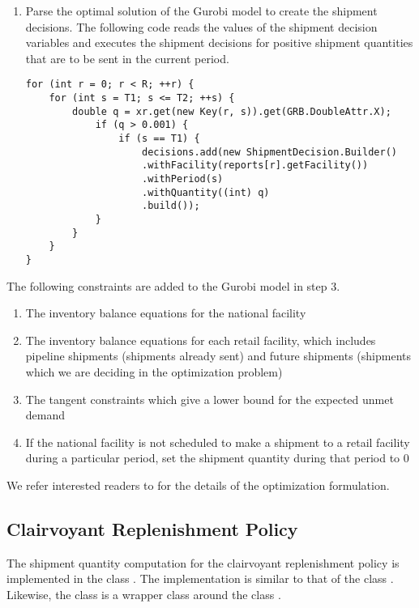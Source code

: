 \begin{enumerate}
\item Parse the optimal solution of the Gurobi model
to create the shipment decisions.
The following code reads the values
of the shipment decision variables 
and executes the shipment decisions
for positive shipment quantities that are to be sent in the current period.
\begin{lstlisting}
for (int r = 0; r < R; ++r) {
    for (int s = T1; s <= T2; ++s) {
        double q = xr.get(new Key(r, s)).get(GRB.DoubleAttr.X);
            if (q > 0.001) {
                if (s == T1) {
                    decisions.add(new ShipmentDecision.Builder()
                    .withFacility(reports[r].getFacility())
                    .withPeriod(s)
                    .withQuantity((int) q)
                    .build());
            }
        }
    }
}
\end{lstlisting}
\end{enumerate}

The following constraints are added to the Gurobi model in step 3.
\begin{enumerate}
\item The inventory balance equations for the national facility
\item The inventory balance equations for each retail facility,
which includes pipeline shipments (shipments already sent)
and future shipments
(shipments which we are deciding in the optimization problem)
\item The tangent constraints which give
a lower bound for the expected unmet demand
\item If the national facility is not scheduled to make a shipment
to a retail facility during a particular period,
set the shipment quantity during that period to $0$
\end{enumerate}

We refer interested readers to \citet{gallien-leung-yadav-2014}
for the details of the optimization formulation.







\subsection{Clairvoyant Replenishment Policy}

The shipment quantity computation for the clairvoyant replenishment policy
is implemented in the class .
The implementation is similar to that of
the class .
Likewise, the class 
is a wrapper class around the class .


